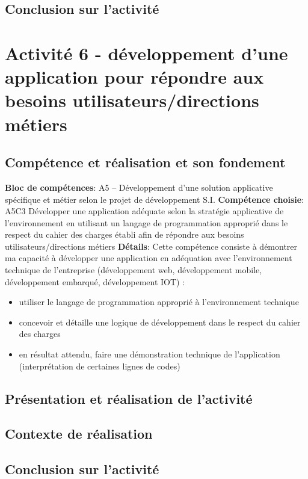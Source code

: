 \documentclass[a4paper, 11pt]{report}
\begin{document}
\subsection{Conclusion sur l'activité}

\section{Activité 6 - développement d'une application pour répondre aux besoins utilisateurs/directions métiers}
\subsection{Compétence et réalisation et son fondement}
\textbf{Bloc de compétences}: A5 – Développement d’une solution applicative spécifique et métier selon le projet de développement S.I.
\newline
\textbf{Compétence choisie}: A5C3 Développer une application adéquate selon la stratégie applicative de l’environnement en utilisant un langage de programmation approprié dans le respect du cahier des charges établi afin de répondre aux besoins utilisateurs/directions métiers
\newline
\textbf{Détails}: Cette compétence consiste à démontrer ma capacité à développer une application en
adéquation avec l’environnement technique de l’entreprise (développement web, développement mobile, développement embarqué, développement IOT) :
\begin{itemize} 
 \item utiliser le langage de programmation approprié à l’environnement technique
 \item concevoir et détaille une logique de développement dans le respect du cahier des charges
 \item en résultat attendu, faire une démonstration technique de l'application (interprétation de certaines lignes de codes)
\end{itemize}
\subsection{Présentation et réalisation de l'activité}
\subsection{Contexte de réalisation}
\subsection{Conclusion sur l'activité}
\end{document}
